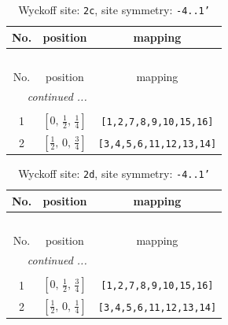 \documentclass[fleqn,8pt]{jsarticle}
\begin{document}
\renewcommand{\arraystretch}{1.2}
\begin{longtable}{ccc}
\caption{Wyckoff site: {\tt 2c}, site symmetry: {\tt -4..1'}}
 \\
 \hline \hline
No. & position & mapping \\ \hline \endfirsthead

\multicolumn{2}{l}{\tablename\ \thetable{}} \\
 \hline \hline
No. & position & mapping \\ \hline \endhead

 \hline \hline
\multicolumn{2}{r}{\footnotesize\it continued ...} \\ \endfoot

 \hline \hline
\multicolumn{2}{r}{} \\ \endlastfoot

1 & $\left[ 0,\, \frac{1}{2},\, \frac{1}{4} \right]$ & {\tt [1,2,7,8,9,10,15,16]} \\ \hline
2 & $\left[ \frac{1}{2},\, 0,\, \frac{3}{4} \right]$ & {\tt [3,4,5,6,11,12,13,14]} \\
\end{longtable}
\renewcommand{\arraystretch}{1.2}
\begin{longtable}{ccc}
\caption{Wyckoff site: {\tt 2d}, site symmetry: {\tt -4..1'}}
 \\
 \hline \hline
No. & position & mapping \\ \hline \endfirsthead

\multicolumn{2}{l}{\tablename\ \thetable{}} \\
 \hline \hline
No. & position & mapping \\ \hline \endhead

 \hline \hline
\multicolumn{2}{r}{\footnotesize\it continued ...} \\ \endfoot

 \hline \hline
\multicolumn{2}{r}{} \\ \endlastfoot

1 & $\left[ 0,\, \frac{1}{2},\, \frac{3}{4} \right]$ & {\tt [1,2,7,8,9,10,15,16]} \\ \hline
2 & $\left[ \frac{1}{2},\, 0,\, \frac{1}{4} \right]$ & {\tt [3,4,5,6,11,12,13,14]} \\
\end{longtable}
\renewcommand{\arraystretch}{1.2}
\end{document}

